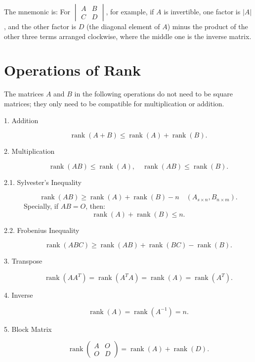 \documentclass[11pt]{../../TexTemplate/elegantbook} %
\begin{document}
\begin{remark}
    The mnemonic is: 
    For \( \begin{vmatrix} A & B \\ C & D \end{vmatrix} \), for example, if \( A \) is invertible, 
    one factor is \( |A| \), and the other factor is \( D \) (the diagonal element of \( A \)) minus 
    the product of the other three terms arranged clockwise, where the middle one is the inverse matrix.
\end{remark}




\section{Operations of Rank}
\begin{proposition}
    The matrices \( A \) and \( B \) in the following operations do not need to be square matrices; 
    they only need to be compatible for multiplication or addition.
    \begin{description}
        \item [1. Addition]
        \[
        \operatorname{rank}(A + B) \leqslant \operatorname{rank}(A) + \operatorname{rank}(B).
        \]
        \item [2. Multiplication]
        \[
        \operatorname{rank}(AB) \leqslant \operatorname{rank}(A), \quad \operatorname{rank}(AB) \leqslant \operatorname{rank}(B).
        \]
        \item[2.1. Sylvester's Inequality]
        \[
        \operatorname{rank}(AB) \geqslant \operatorname{rank}(A) + \operatorname{rank}(B) - n \quad (A_{s \times n}, B_{n \times m}).
        \]
        Specially, if \( AB = O \), then:
        \[
        \operatorname{rank}(A) + \operatorname{rank}(B) \leqslant n.
        \]

        \item[2.2. Frobenius Inequality]
        \[
        \operatorname{rank}(ABC) \geqslant \operatorname{rank}(AB) + \operatorname{rank}(BC) - \operatorname{rank}(B).
        \]

        \item [3. Transpose]
        \[
        \operatorname{rank}(AA^T) = \operatorname{rank}(A^TA) = \operatorname{rank}(A) = \operatorname{rank}(A^T).
        \]

        \item [4. Inverse]
        \[
        \operatorname{rank}(A) = \operatorname{rank}(A^{-1}) = n.
        \]

        \item[5. Block Matrix]
        \[
        \operatorname{rank}\begin{pmatrix} A & O \\ O & D \end{pmatrix} = \operatorname{rank}(A) + \operatorname{rank}(D).
        \]
    \end{description}
\end{proposition}
\end{document}
